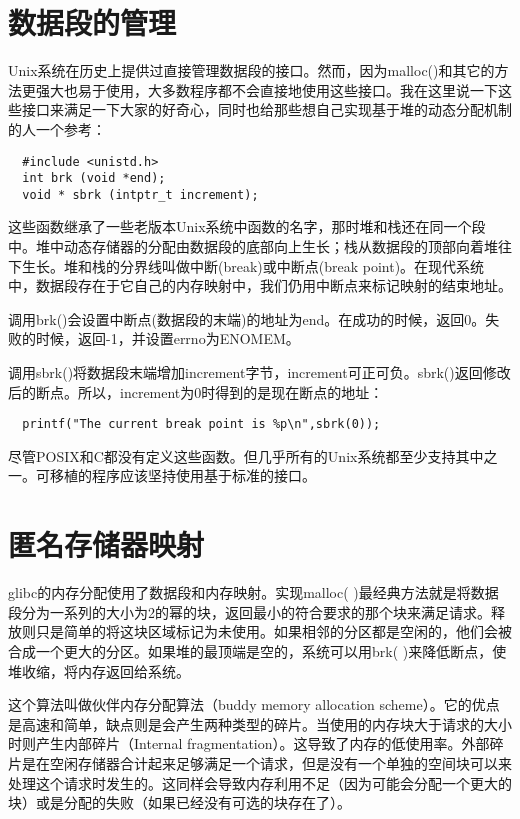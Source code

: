 \section{数据段的管理}

Unix系统在历史上提供过直接管理数据段的接口。然而，因为malloc()和其它的方法更强大也易于使用，大多数程序都不会直接地使用这些接口。我在这里说一下这些接口来满足一下大家的好奇心，同时也给那些想自己实现基于堆的动态分配机制的人一个参考： 

\begin{lstlisting}
  #include <unistd.h>
  int brk (void *end);
  void * sbrk (intptr_t increment);
\end{lstlisting}

这些函数继承了一些老版本Unix系统中函数的名字，那时堆和栈还在同一个段中。堆中动态存储器的分配由数据段的底部向上生长；栈从数据段的顶部向着堆往下生长。堆和栈的分界线叫做中断(break)或中断点(break point)。在现代系统中，数据段存在于它自己的内存映射中，我们仍用中断点来标记映射的结束地址。

调用brk()会设置中断点(数据段的末端)的地址为end。在成功的时候，返回0。失败的时候，返回-1，并设置errno为ENOMEM。

调用sbrk()将数据段末端增加increment字节，increment可正可负。sbrk()返回修改后的断点。所以，increment为0时得到的是现在断点的地址： 

\begin{lstlisting}
  printf("The current break point is %p\n",sbrk(0));
\end{lstlisting}

尽管POSIX和C都没有定义这些函数。但几乎所有的Unix系统都至少支持其中之一。可移植的程序应该坚持使用基于标准的接口。 

\section{匿名存储器映射}

glibc的内存分配使用了数据段和内存映射。实现malloc( )最经典方法就是将数据段分为一系列的大小为2的幂的块，返回最小的符合要求的那个块来满足请求。释放则只是简单的将这块区域标记为未使用。如果相邻的分区都是空闲的，他们会被合成一个更大的分区。如果堆的最顶端是空的，系统可以用brk( )来降低断点，使堆收缩，将内存返回给系统。

这个算法叫做伙伴内存分配算法（buddy memory allocation scheme）。它的优点是高速和简单，缺点则是会产生两种类型的碎片。当使用的内存块大于请求的大小时则产生内部碎片（Internal fragmentation）。这导致了内存的低使用率。外部碎片是在空闲存储器合计起来足够满足一个请求，但是没有一个单独的空间块可以来处理这个请求时发生的。这同样会导致内存利用不足（因为可能会分配一个更大的块）或是分配的失败（如果已经没有可选的块存在了）。

